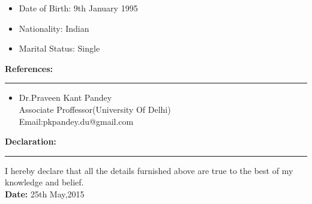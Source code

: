 \documentclass[a4paper,10pt]{article}
\begin{document}
\begin{flushleft}
\begin{itemize}
    	\item Date of Birth:     9th January 1995 \\
    	\item Nationality:       Indian\\
    	\item Marital Status:    Single\\
    \end{itemize}
     \textbf{ References: }\\
   \hrule
    
    \begin{itemize}
    	\item Dr.Praveen Kant Pandey\\
    	Associate Proffessor(University Of Delhi)\\
    	      Email:pkpandey.du@gmail.com
    	      
     \end{itemize}
     \textbf{ Declaration: }\\
      \hrule
     I hereby declare that all the details furnished above are true to the best of my knowledge and belief.\\
     \bigskip
     \textbf{ Date: }25th May,2015\\
      
   
	\end{flushleft}
	
\end{document}
